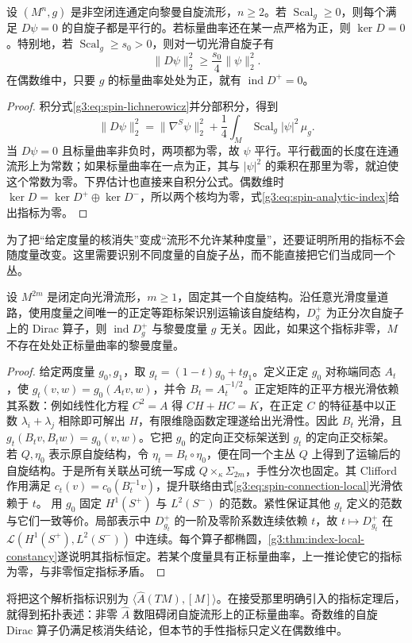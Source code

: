 \begin{corollary}\label{g3:cor:spin-positive-scalar-vanishing}
	设 \((M^n,g)\) 是非空闭连通定向黎曼自旋流形，\(n\ge2\)。若 \(\operatorname{Scal}_g\ge0\)，则每个满足 \(D\psi=0\) 的自旋子都是平行的。若标量曲率还在某一点严格为正，则 \(\ker D=0\)。特别地，若 \(\operatorname{Scal}_g\ge s_0>0\)，则对一切光滑自旋子有
	\[
		\|D\psi\|_2^2\ge\frac{s_0}{4}\|\psi\|_2^2.
	\]
	在偶数维中，只要 \(g\) 的标量曲率处处为正，就有 \(\operatorname{ind}D^+=0\)。
\end{corollary}
\begin{proof}
	积分式\eqref{g3:eq:spin-lichnerowicz}并分部积分，得到
	\begin{equation}\label{g3:eq:spin-integrated-lichnerowicz}
		\|D\psi\|_2^2=\|\nabla^S\psi\|_2^2
		+\frac14\int_M\operatorname{Scal}_g|\psi|^2\,\mu_g.
	\end{equation}
	当 \(D\psi=0\) 且标量曲率非负时，两项都为零，故 \(\psi\) 平行。平行截面的长度在连通流形上为常数；如果标量曲率在一点为正，其与 \(|\psi|^2\) 的乘积在那里为零，就迫使这个常数为零。下界估计也直接来自积分公式。偶数维时 \(\ker D=\ker D^+\oplus\ker D^-\)，所以两个核均为零，式\eqref{g3:eq:spin-analytic-index}给出指标为零。
\end{proof}

为了把“给定度量的核消失”变成“流形不允许某种度量”，还要证明所用的指标不会随度量改变。这里需要识别不同度量的自旋子丛，而不能直接把它们当成同一个丛。

\begin{proposition}\label{g3:prop:spin-index-metric-independent}
	设 \(M^{2m}\) 是闭定向光滑流形，\(m\ge1\)，固定其一个自旋结构。沿任意光滑度量道路，使用度量之间唯一的正定等距标架识别运输该自旋结构，\(D_g^+\) 为正分次自旋子上的 Dirac 算子，则 \(\operatorname{ind}D_g^+\) 与黎曼度量 \(g\) 无关。因此，如果这个指标非零，\(M\) 不存在处处正标量曲率的黎曼度量。
\end{proposition}
\begin{proof}
	给定两度量 \(g_0,g_1\)，取 \(g_t=(1-t)g_0+tg_1\)。定义正定 \(g_0\) 对称端同态 \(A_t\)，使
	\(g_t(v,w)=g_0(A_tv,w)\)，并令 \(B_t=A_t^{-1/2}\)。正定矩阵的正平方根光滑依赖其系数：例如线性化方程 \(C^2=A\) 得 \(CH+HC=K\)，在正定 \(C\) 的特征基中以正数 \(\lambda_i+\lambda_j\) 相除即可解出 \(H\)，有限维隐函数定理遂给出光滑性。因此 \(B_t\) 光滑，且
	\(g_t(B_tv,B_tw)=g_0(v,w)\)。它把 \(g_0\) 的定向正交标架送到 \(g_t\) 的定向正交标架。
	若 \(Q,\eta_0\) 表示原自旋结构，令 \(\eta_t=B_t\circ\eta_0\)，便在同一个主丛 \(Q\) 上得到了运输后的自旋结构。于是所有关联丛可统一写成 \(Q\times_\kappa\Sigma_{2m}\)，手性分次也固定。其 Clifford 作用满足 \(c_t(v)=c_0(B_t^{-1}v)\)，提升联络由式\eqref{g3:eq:spin-connection-local}光滑依赖于 \(t\)。
	用 \(g_0\) 固定 \(H^1(S^+)\) 与 \(L^2(S^-)\) 的范数。紧性保证其他 \(g_t\) 定义的范数与它们一致等价。局部表示中 \(D_{g_t}^+\) 的一阶及零阶系数连续依赖 \(t\)，故
	\(t\mapsto D_{g_t}^+\) 在 \(\mathcal L(H^1(S^+),L^2(S^-))\) 中连续。每个算子都椭圆，\cref{g3:thm:index-local-constancy}遂说明其指标恒定。若某个度量具有正标量曲率，上一推论使它的指标为零，与非零恒定指标矛盾。
\end{proof}

将把这个解析指标识别为
\(\langle\widehat A(TM),[M]\rangle\)。在接受那里明确引入的指标定理后，就得到拓扑表述：非零 \(\widehat A\) 数阻碍闭自旋流形上的正标量曲率。奇数维的自旋 Dirac 算子仍满足核消失结论，但本节的手性指标只定义在偶数维中。
